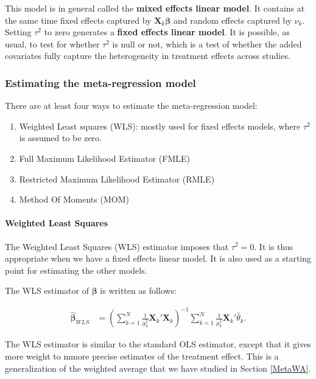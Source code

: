 \documentclass[]{book}
\providecommand{\tightlist}{%
  \setlength{\itemsep}{0pt}\setlength{\parskip}{0pt}}
\let\oldparagraph\paragraph
\renewcommand{\paragraph}[1]{\oldparagraph{#1}\mbox{}}
\theoremstyle{definition}
\theoremstyle{definition}
\theoremstyle{definition}
\theoremstyle{remark}
\begin{document}
This model is in general called the \textbf{mixed effects linear model}.
It contains at the same time fixed effects captured by \(\mathbf{X}_k \mathbf{\beta}\) and random effects captured by \(\nu_k\).
Setting \(\tau^2\) to zero generates a \textbf{fixed effects linear model}.
It is possible, as usual, to test for whether \(\tau^2\) is null or not, which is a test of whether the added covariates fully capture the heterogeneity in treatment effects across studies.

\hypertarget{estimating-the-meta-regression-model}{%
\subsubsection{Estimating the meta-regression model}\label{estimating-the-meta-regression-model}}

There are at least four ways to estimate the meta-regression model:

\begin{enumerate}
\def\labelenumi{\arabic{enumi}.}
\tightlist
\item
  Weighted Least squares (WLS): mostly used for fixed effects models, where \(\tau^2\) is assumed to be zero.
\item
  Full Maximum Likelihood Estimator (FMLE)
\item
  Restricted Maximum Likelihood Estimator (RMLE)
\item
  Method Of Moments (MOM)
\end{enumerate}

\hypertarget{weighted-least-squares}{%
\paragraph{Weighted Least Squares}\label{weighted-least-squares}}

The Weighted Least Squares (WLS) estimator imposes that \(\tau^2=0\).
It is thus appropriate when we have a fixed effects linear model.
It is also used as a starting point for estimating the other models.

The WLS estimator of \(\mathbf{\beta}\) is written as follows:

\begin{align*}
  \mathbf{\hat{\beta}}_{WLS} & = \left(\sum_{k=1}^N\frac{1}{\hat{\sigma}^2_k}\mathbf{X}_k'\mathbf{X}_k\right)^{-1}\sum_{k=1}^N\frac{1}{\hat{\sigma}^2_k}\mathbf{X}_k'\hat{\theta}_k.
\end{align*}

The WLS estimator is similar to the standard OLS estimator, except that it gives more weight to mmore precise estimates of the treatment effect.
This is a generalization of the weighted average that we have studied in Section \ref{MetaWA}.
\end{document}
